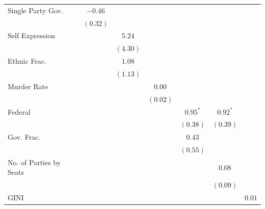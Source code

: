 \documentclass[a4paper]{article}\usepackage[]{graphicx}\usepackage[]{color}
\begin{document}
\begin{table}
\begin{center}
\begin{tabular}{l c c c c c c c }
Single Party Gov.       &               & $-0.46$       &              &               &              &              &             \\
                        &               & $(0.32)$      &              &               &              &              &             \\
Self Expression         &               &               & $5.24$       &               &              &              &             \\
                        &               &               & $(4.30)$     &               &              &              &             \\
Ethnic Frac.            &               &               & $1.08$       &               &              &              &             \\
                        &               &               & $(1.13)$     &               &              &              &             \\
Murder Rate             &               &               &              & $0.00$        &              &              &             \\
                        &               &               &              & $(0.02)$      &              &              &             \\
Federal                 &               &               &              &               & $0.95^{*}$   & $0.92^{*}$   &             \\
                        &               &               &              &               & $(0.38)$     & $(0.39)$     &             \\
Gov. Frac.              &               &               &              &               & $0.43$       &              &             \\
                        &               &               &              &               & $(0.55)$     &              &             \\
No. of Parties by Seats &               &               &              &               &              & $0.08$       &             \\
                        &               &               &              &               &              & $(0.09)$     &             \\
GINI                    &               &               &              &               &              &              & $0.01$      \\

\end{tabular}
\end{center}
\end{table}
\end{document}
